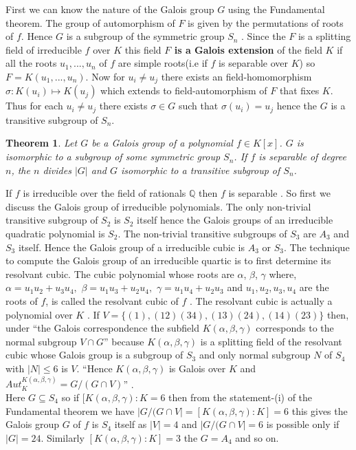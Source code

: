 \documentclass[a4paper,twoside,10pt]{article}
\theoremstyle{plain}
\newtheorem{theorem}{Theorem}[section]
\theoremstyle{definition}
\begin{document}
\noindent
First we can know the nature of the Galois group \(G\) using the Fundamental theorem. The group of automorphism of \(F\) is given by the permutations of roots of \(f\). Hence \(G\) is a subgroup of the symmetric group \(S_n\) \cite{hunger}. Since the  \(F\) is a splitting field of irreducible \(f\) over \(K\) this field \textbf{\(F\) is a Galois extension} of the field \(K\) if all the roots \(u_1,...,u_n\) of \(f\) are simple roots(i.e if \(f\) is separable over \(K\)) so \(F=K(u_1,...,u_n)\). Now for \(u_i \neq u_j\) there exists an field-homomorphism \( \sigma : K(u_i) \mapsto K(u_j) \) which extends to field-automorphism of \(F\) that fixes \(K\). Thus for each \(u_i \neq u_j\) there exists \(\sigma \in G\) such that \(\sigma(u_i) = u_j\) hence the \(G\) is a transitive subgroup of \(S_n\).

\begin{theorem} \cite{hunger}
  Let \(G\) be a Galois group of a polynomial \(f \in K[x]\). \(G\) is isomorphic to a subgroup of some symmetric group \(S_n\). If \(f\) is separable of degree \(n\), the \(n\) divides \(|G|\) and \(G\) isomorphic to a transitive subgroup of \(S_n\).
\end{theorem}

\noindent
If \(f\) is irreducible over the field of rationals \(\mathbb{Q}\) then \(f\) is separable \cite{hunger}. So first we discuss the Galois group of irreducible polynomials. The only non-trivial transitive subgroup of \(S_2\) is \(S_2\) itself hence the Galois groups of an irreducible quadratic polynomial is \(S_2\). The non-trivial transitive subgroups of \(S_3\) are \(A_3\) and \(S_3\) itself. Hence the Galois group of a irreducible cubic is \(A_3\) or \(S_3\). The technique to compute the Galois group of an irreducible quartic is to first determine its resolvant cubic. The cubic polynomial whose roots are \(\alpha\), \(\beta\), \(\gamma\) where, \(\alpha=u_1u_2+u_3u_4,\) \(\beta=u_1u_3+u_2u_4,\) \(\gamma=u_1u_4+u_2u_3\) and  \(u_1, u_2, u_3, u_4\) are the roots of \(f\), is called the resolvant cubic of \(f\) \cite{hunger}. The resolvant cubic is actually a polynomial over \(K\) \cite{hunger}. If \(V=\{(1),(12)(34),(13)(24),(14)(23)\}\) then, under ``the Galois correspondence the subfield \(K(\alpha, \beta, \gamma)\) corresponds to the normal subgroup \(V \cap G\)'' \cite{hunger} because \(K(\alpha,\beta,\gamma)\) is a splitting field of the resolvant cubic whose Galois group is a subgroup of \(S_3\) and only normal subgroup \(N\) of \(S_4\) with \(|N| \leq 6\) is \(V\). ``Hence \(K(\alpha, \beta, \gamma)\) is Galois over \(K\) and \(Aut_K^{K(\alpha, \beta, \gamma)} = G/(G \cap V)\)'' \cite{hunger}.\\[2mm]
Here \(G \subseteq S_4\) so if \([K(\alpha, \beta, \gamma):K=6\) then from the statement-(i) of the Fundamental theorem we have \(|G/(G \cap V|= [K(\alpha, \beta, \gamma):K]=6\) this gives the Galois group \(G\) of \(f\) is \(S_4\) itself as \(|V|=4\) and \(|G/(G \cap V|=6\) is possible only if \(|G|=24\). Similarly  \([K(\alpha, \beta, \gamma):K]=3\) the \(G=A_4\) and so on.
\clearpage
\end{document}
